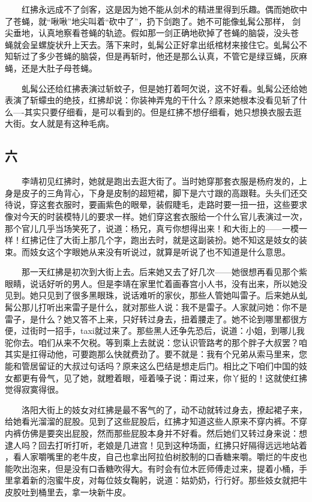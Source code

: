 　　红拂永远成不了剑客，这是因为她不能从剑术的精进里得到乐趣。偶而她砍中 了苍蝇，就“啾啾”地尖叫着“砍中了”，扔下剑跑了。她不可能像虬髯公那样， 剑尖垂地，认真地察看苍蝇的轨迹。假如那一剑正确地砍掉了苍蝇的脑袋，没头苍 蝇就会呈螺旋状升上天去。落下来时，虬髯公正好拿出纸棺材来接住它。虬髯公不 知斩过了多少苍蝇的脑袋，但是再斩时，他还是那么认真，不管它是绿豆蝇，灰麻 蝇，还是大肚子母苍蝇。

 　　虬髯公还给红拂表演过斩蚊子，但是她打着呵欠说，这不好看。虬髯公还给她 表演了斩蠓虫的绝技，红拂却说：你装神弄鬼的干什么？原来她根本没看见斩了什 么----其实只要仔细看，是可以看到的。但是红拂不想仔细看，她只想换衣服去逛 大街。女人就是有这种毛病。 
 
 
\subsection{六} 
 
 　　李靖初见红拂时，她就是跑出去逛大街了。当时她穿那套衣服是杨府发的，上 身是皮子的三角背心，下身是皮制的超短裙，脚下是六寸跟的高跟鞋。头头们还交 待说，穿这套衣服时，要画紫色的眼晕，装假睫毛，走路时要一扭一扭，这些要求 像对今天的时装模特儿的要求一样。她们穿这套衣服给一个什么官儿表演过一次， 那个官儿几乎当场笑死了，说道：杨兄，真亏你想得出来！和大街上的——一模一 样！红拂记住了大街上那几个字，跑出去时，就是这副装扮。她不知这是妓女的装 束。而妓女这个字眼她从来没有听说过，就算是听说了也不知道是什么意思。

 　　那一天红拂是初次到大街上去。后来她又去了好几次——她很想再看见那个紫 眼睛，说话好听的男人。但是李靖在家里忙着画春宫小人书，没有出来，所以她没 见到。她只见到了很多黑眼珠，说话难听的家伙，那些人管她叫雷子。后来她从虬 髯公那儿打听出来雷子是什么，就对那些人说：我不是雷子。人家就问她：你不是 雷子，是什么？她又答不上来，只好转过身去，扭着腰走了。她不论到哪里都很方 便，过街时一招手，taxi就过来了。那些黑人还争先恐后，说道：小姐，到哪儿我 驼你去。咱们从来不欠税。等到乘上去就说：您认识管路考的那个胖子大叔罢？咱 其实是扛得动他，可要跑那么快就费劲了。要不就是：我有个兄弟从索马里来，您 能和管居留证的大叔过句话吗？原来这么巴结是想走后门。相比之下咱们中国的妓 女都更有骨气，见了她，就瞪着眼，哑着嗓子说：甭过来，你丫挺的！这就使红拂 觉得寂寞得很。 

　　洛阳大街上的妓女对红拂是最不客气的了，动不动就转过身去，撩起裙子来， 给她看光溜溜的屁股。见到了这些屁股后，红拂才知道这些人原来不穿内裤。不穿 内裤仿佛是要突出屁股，然而那些屁股本身并不好看。然后她们又转过身来说：想 逮人吗？回去打听打听，老娘是几进宫！见到这种场面，红拂只好隔得远远地站着 ，看人家嚼嘴里的老牛皮，自己也拿出阿拉伯树胶制的口香糖来嚼。嚼烂的牛皮也 能吹出泡来，但是没有口香糖吹得大。有时会有位木匠师傅走过来，提着小桶，手 里拿着新的泡蜜牛皮，对每位妓女鞠躬，说道：姑奶奶，行行好。那些妓女就把牛 皮胶吐到桶里去，拿一块新牛皮。


